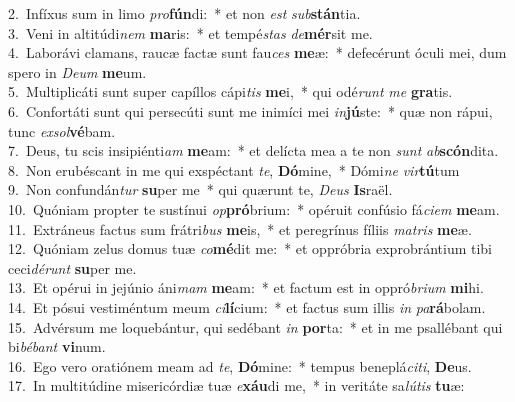 {2.~}Infíxus sum in limo \textit{pro}\textbf{fún}di:~* et non \textit{est} \textit{sub}\textbf{stán}tia.\\
{3.~}Veni in altitúdi\textit{nem} \textbf{ma}ris:~* et tempé\textit{stas} \textit{de}\textbf{mér}sit me.\\
{4.~}Laborávi clamans, raucæ factæ sunt fau\textit{ces} \textbf{me}æ:~* defecérunt óculi mei, dum spero in \textit{De}\textit{um} \textbf{me}um.\\
{5.~}Multiplicáti sunt super capíllos cápi\textit{tis} \textbf{me}i,~* qui odé\textit{runt} \textit{me} \textbf{gra}tis.\\
{6.~}Confortáti sunt qui persecúti sunt me inimíci mei \textit{in}\textbf{jú}ste:~* quæ non rápui, tunc \textit{ex}\textit{sol}\textbf{vé}bam.\\
{7.~}Deus, tu scis insipiénti\textit{am} \textbf{me}am:~* et delícta mea a te non \textit{sunt} \textit{ab}\textbf{scón}dita.\\
{8.~}Non erubéscant in me qui exspéctant \textit{te}, \textbf{Dó}mine,~* Dómi\textit{ne} \textit{vir}\textbf{tú}tum\\
{9.~}Non confundán\textit{tur} \textbf{su}per me~* qui quærunt te, \textit{De}\textit{us} \textbf{Is}raël.\\
{10.~}Quóniam propter te sustínui \textit{op}\textbf{pró}brium:~* opéruit confúsio fá\textit{ci}\textit{em} \textbf{me}am.\\
{11.~}Extráneus factus sum frátri\textit{bus} \textbf{me}is,~* et peregrínus fíliis \textit{ma}\textit{tris} \textbf{me}æ.\\
{12.~}Quóniam zelus domus tuæ \textit{co}\textbf{mé}dit me:~* et oppróbria exprobrántium tibi ceci\textit{dé}\textit{runt} \textbf{su}per me.\\
{13.~}Et opérui in jejúnio áni\textit{mam} \textbf{me}am:~* et factum est in oppró\textit{bri}\textit{um} \textbf{mi}hi.\\
{14.~}Et pósui vestiméntum meum \textit{ci}\textbf{lí}cium:~* et factus sum illis \textit{in} \textit{pa}\textbf{rá}bolam.\\
{15.~}Advérsum me loquebántur, qui sedébant \textit{in} \textbf{por}ta:~* et in me psallébant qui bi\textit{bé}\textit{bant} \textbf{vi}num.\\
{16.~}Ego vero oratiónem meam ad \textit{te}, \textbf{Dó}mine:~* tempus beneplá\textit{ci}\textit{ti}, \textbf{De}us.\\
{17.~}In multitúdine misericórdiæ tuæ \textit{e}\textbf{xáu}di me,~* in veritáte sa\textit{lú}\textit{tis} \textbf{tu}æ:\\
